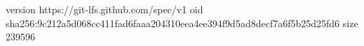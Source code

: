 version https://git-lfs.github.com/spec/v1
oid sha256:9c212a5d068cc411fad6faaa204310eea4ee394f9d5ad8decf7a6f5b25d25fd6
size 239596

